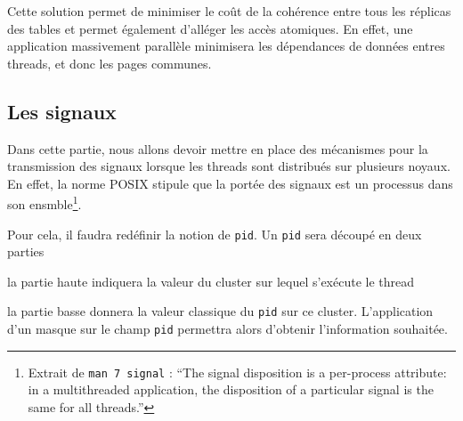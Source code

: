       Cette solution permet de minimiser le coût de la cohérence entre tous les
      réplicas des tables et permet également d'alléger les accès atomiques. En
      effet, une application massivement parallèle minimisera les dépendances de
      données entres threads, et donc les pages communes.


    \subsection{Les signaux}



      Dans cette partie, nous allons devoir mettre en place des mécanismes pour
      la transmission des signaux lorsque les threads sont distribués sur
      plusieurs noyaux. En effet, la norme POSIX stipule que la portée des
      signaux est un processus dans son ensmble\footnote{Extrait de \texttt{man
          7 signal} : ``The signal disposition is a per-process attribute: in a
        multithreaded application, the disposition of a particular signal is the
        same for all threads.''}.

      Pour cela, il faudra redéfinir la notion de \texttt{pid}. Un \texttt{pid}
      sera découpé en deux parties \benumline \item la partie haute indiquera la
      valeur du cluster sur lequel s'exécute le thread \item la partie basse
      donnera la valeur classique du \texttt{pid} sur ce
      cluster\eenumline. L'application d'un masque sur le champ \texttt{pid}
      permettra alors d'obtenir l'information souhaitée.

